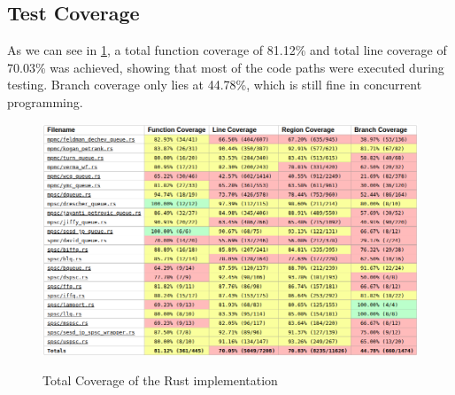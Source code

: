 \subsection{Test Coverage}
As we can see in \cref{fig:cov}, a total function coverage of 81.12\% and total line coverage of 70.03\% was achieved, showing that most of the code paths were executed during testing. Branch coverage only lies at 44.78\%, which is still fine in concurrent programming.
\begin{figure}[!ht]
    \centering
    \captionsetup{justification=centering}
    \caption{Total Coverage of the Rust implementation}
    \includegraphics[width=145mm]{images/coverage.png}
    \label{fig:cov}
\end{figure}
